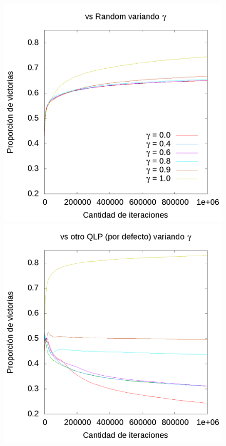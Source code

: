 \documentclass[10pt, a4paper]{article}
\begin{document}
\begin{figure}[h]
 \centering
  \begin{minipage}[c]{1\textwidth}
	\includegraphics[scale=0.2]{GammaR.png}
	\includegraphics[scale=0.2]{GammaQ.png}

\end{minipage}
\end{figure}
\end{document}
